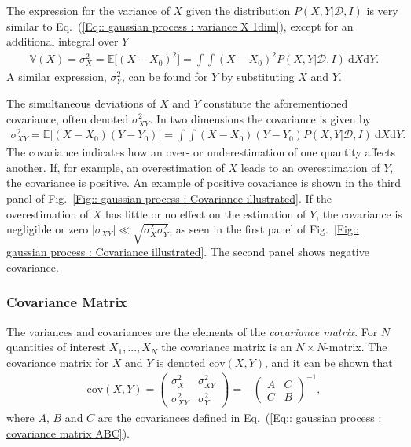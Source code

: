 \documentclass[twoside,english]{uiofysmaster}
\begin{document}
{The expression for the variance of $X$ given the distribution $P(X,Y| \mathcal{D}, I)$ is very similar to Eq.~(\ref{Eq:: gaussian process : variance X 1dim}), except for an additional integral over $Y$
\begin{align}
\mathbb{V}(X) = \sigma^2_X = \mathbb{E} \big[ (X-X_0)^2 \big] = \int \int (X-X_0)^2 P(X,Y | \mathcal{D}, I) ~\text{d}X\text{d}Y.
\end{align}
A similar expression, $\sigma_Y^2$, can be found for $Y$ by substituting $X$ and $Y$. 

The simultaneous deviations of $X$ and $Y$ constitute the aforementioned covariance, often denoted $\sigma_{XY}^2$. In two dimensions the covariance is given by
\begin{align}
\sigma_{XY}^2 = \mathbb{E} \big[(X - X_0) (Y - Y_0) \big] =\int \int (X - X_0) (Y - Y_0) P (X, Y | \mathcal{D}, I) ~\text{d}X\text{d}Y.
\end{align}
The covariance indicates how an over- or underestimation of one quantity affects another. If, for example, an overestimation of $X$ leads to an overestimation of $Y$, the covariance is positive. An example of positive covariance is shown in the third panel of Fig.~\ref{Fig:: gaussian process : Covariance illustrated}. If the overestimation of $X$ has little or no effect on the estimation of $Y$, the covariance is negligible or zero $|\sigma_{XY}| \ll \sqrt{\sigma_X^2 \sigma_Y^2}$, as seen in the first panel of Fig.~\ref{Fig:: gaussian process : Covariance illustrated}. The second panel shows negative covariance.

\subsubsection{Covariance Matrix}

The variances and covariances are the elements of the \textit{covariance matrix}. For $N$ quantities of interest $X_1, ...,X_N$ the covariance matrix is an $N \times N$-matrix. The covariance matrix for $X$ and $Y$ is denoted $\text{cov}(X,Y)$, and it can be shown that \cite{sivia2006data}
\begin{align}
\text{cov}(X,Y) = 
\begin{pmatrix}
\sigma_X^2 & \sigma_{XY}^2\\
\sigma_{XY}^2 & \sigma_Y^2
\end{pmatrix}
= - \begin{pmatrix}
A & C\\
C & B
\end{pmatrix}^{-1},
\end{align}
where $A$, $B$ and $C$ are the covariances defined in Eq.~(\ref{Eq:: gaussian process : covariance matrix ABC}).

}
\end{document}
